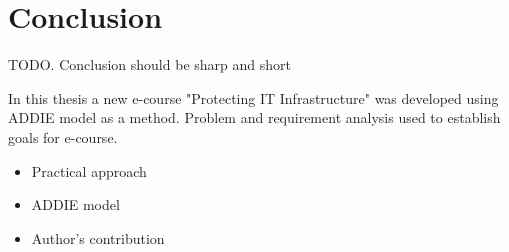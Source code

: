 \chapter{Conclusion}
\label{conclusion}

{\color{red} TODO. Conclusion should be sharp and short }

In this thesis a new e-course "Protecting IT Infrastructure" was developed using ADDIE model as a method. Problem and requirement analysis used to establish goals for e-course.

\begin{itemize}
\item Practical approach
\item ADDIE model
\item Author's contribution
\end{itemize}

